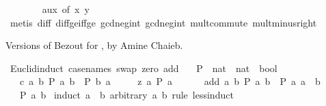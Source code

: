 \begin{isabellebody}
\ \ \ \ \ \ \isamarkupfalse%
\ aux\ {\isacharbrackleft}{\kern0pt}of\ {\isachardoublequoteopen}{\isacharminus}{\kern0pt}x{\isachardoublequoteclose}\ {\isachardoublequoteopen}{\isacharminus}{\kern0pt}y{\isachardoublequoteclose}{\isacharbrackright}{\kern0pt}\isanewline
\ \ \ \ \ \ \isamarkupfalse%
\ {\isacharparenleft}{\kern0pt}metis\ diff{\isacharunderscore}{\kern0pt}{}\ diff{\isacharunderscore}{\kern0pt}ge{\isacharunderscore}{\kern0pt}{}{\isacharunderscore}{\kern0pt}iff{\isacharunderscore}{\kern0pt}ge\ gcd{\isacharunderscore}{\kern0pt}neg{}{\isacharunderscore}{\kern0pt}int\ gcd{\isacharunderscore}{\kern0pt}neg{}{\isacharunderscore}{\kern0pt}int\ mult{\isachardot}{\kern0pt}commute\ mult{\isacharunderscore}{\kern0pt}minus{\isacharunderscore}{\kern0pt}right{\isacharparenright}{\kern0pt}\isanewline
\ \ \isamarkupfalse%
\isanewline
{}\isamarkupfalse%
%
\endisatagproof
{\isafoldproof}%
%
\isadelimproof
%
\endisadelimproof
%
\begin{isamarkuptext}%
Versions of Bezout for , by Amine Chaieb.%
\end{isamarkuptext}\isamarkuptrue%
\isamarkupfalse%
\ Euclid{\isacharunderscore}{\kern0pt}induct\ {\isacharbrackleft}{\kern0pt}case{\isacharunderscore}{\kern0pt}names\ swap\ zero\ add{\isacharbrackright}{\kern0pt}{\isacharcolon}{\kern0pt}\isanewline
\ \ \ P\ {\isacharcolon}{\kern0pt}{\isacharcolon}{\kern0pt}\ {\isachardoublequoteopen}nat\ {\isasymRightarrow}\ nat\ {\isasymRightarrow}\ bool{\isachardoublequoteclose}\isanewline
\ \ \ c{\isacharcolon}{\kern0pt}\ {\isachardoublequoteopen}{\isasymAnd}a\ b{\isachardot}{\kern0pt}\ P\ a\ b\ {\isasymlongleftrightarrow}\ P\ b\ a{\isachardoublequoteclose}\isanewline
\ \ \ \ \ z{\isacharcolon}{\kern0pt}\ {\isachardoublequoteopen}{\isasymAnd}a{\isachardot}{\kern0pt}\ P\ a\ {}{\isachardoublequoteclose}\isanewline
\ \ \ \ \ add{\isacharcolon}{\kern0pt}\ {\isachardoublequoteopen}{\isasymAnd}a\ b{\isachardot}{\kern0pt}\ P\ a\ b\ {\isasymlongrightarrow}\ P\ a\ {\isacharparenleft}{\kern0pt}a\ {\isacharplus}{\kern0pt}\ b{\isacharparenright}{\kern0pt}{\isachardoublequoteclose}\isanewline
\ \ \ {\isachardoublequoteopen}P\ a\ b{\isachardoublequoteclose}\isanewline
%
\isadelimproof
%
\endisadelimproof
%
\isatagproof
{}\isamarkupfalse%
\ {\isacharparenleft}{\kern0pt}induct\ {\isachardoublequoteopen}a\ {\isacharplus}{\kern0pt}\ b{\isachardoublequoteclose}\ arbitrary{\isacharcolon}{\kern0pt}\ a\ b\ rule{\isacharcolon}{\kern0pt}\ less{\isacharunderscore}{\kern0pt}induct{\isacharparenright}{\kern0pt}\isanewline

\end{isabellebody}
